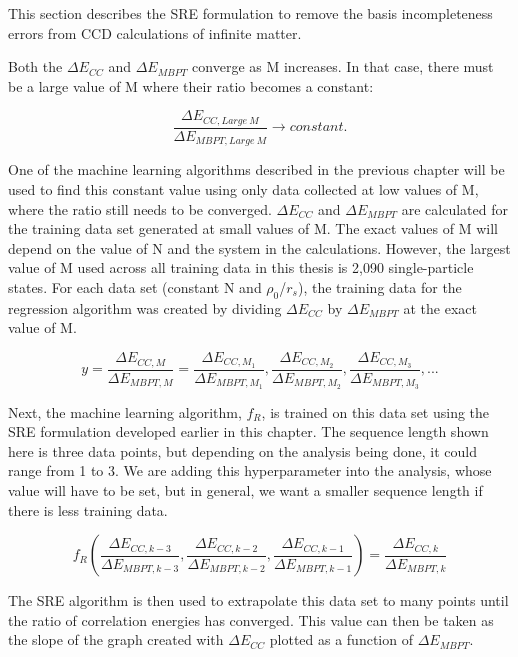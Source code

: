 This section describes the SRE formulation to remove the basis incompleteness errors from CCD calculations of infinite matter. 

Both the $\Delta E_{CC}$ and $\Delta E_{MBPT}$ converge as M increases. In that case, there must be a large value of M where their ratio becomes a constant:


\begin{equation}
\frac{\Delta E_{CC,Large\ M}}{\Delta E_{MBPT,Large\ M}} \longrightarrow constant.
\end{equation}

One of the machine learning algorithms described in the previous chapter will be used to find this constant value using only data collected at low values of M, where the ratio still needs to be converged. $\Delta E_{CC}$ and $\Delta E_{MBPT}$ are calculated for the training data set generated at small values of M. The exact values of M will depend on the value of N and the system in the calculations. However, the largest value of M used across all training data in this thesis is 2,090 single-particle states. For each data set (constant N and $\rho_0$/$r_s$), the training data for the regression algorithm was created by dividing $\Delta E_{CC}$ by $\Delta E_{MBPT}$ at the exact value of M.

\begin{equation}
y =\frac{\Delta E_{CC,M}}{\Delta E_{MBPT,M}} = \frac{\Delta E_{CC,M_1}}{\Delta E_{MBPT,M_1}}, \frac{\Delta E_{CC,M_2}}{\Delta E_{MBPT,M_2}}, \frac{\Delta E_{CC,M_3}}{\Delta E_{MBPT,M_3}}, ...
\end{equation}

Next, the machine learning algorithm, $f_R$, is trained on this data set using the SRE formulation developed earlier in this chapter. The sequence length shown here is three data points, but depending on the analysis being done, it could range from 1 to 3. We are adding this hyperparameter into the analysis, whose value will have to be set, but in general, we want a smaller sequence length if there is less training data. 

\begin{equation}
f_{R}(\frac{\Delta E_{CC,k-3}}{\Delta E_{MBPT,k-3}},\frac{\Delta E_{CC,k-2}}{\Delta E_{MBPT,k-2}}, \frac{\Delta E_{CC,k-1}}{\Delta E_{MBPT,k-1}}) = \frac{\Delta E_{CC,k}}{\Delta E_{MBPT,k}}
\end{equation}

The SRE algorithm is then used to extrapolate this data set to many points until the ratio of correlation energies has converged. This value can then be taken as the slope of the graph created with $\Delta E_{CC}$ plotted as a function of $\Delta E_{MBPT}$.

